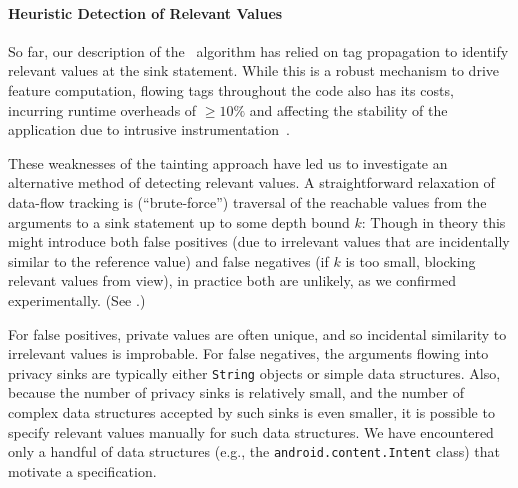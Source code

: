 \paragraph{Heuristic Detection of Relevant Values} So far, our description of the \Tool\ algorithm has relied on tag propagation to identify relevant values at the sink statement. While this is a robust mechanism to drive feature computation, flowing tags throughout the code also has its costs, incurring runtime overheads of $\geq 10\%$ and affecting the stability of the application due to intrusive instrumentation~\cite{EGCCJMS:OSDI10}.

These weaknesses of the tainting approach have led us to investigate an alternative method of detecting relevant values. A straightforward relaxation of data-flow tracking is  (``brute-force'') traversal of the reachable values from the arguments to a sink statement up to some depth bound $k$: 
Though in theory this might introduce both false positives (due to irrelevant values that are incidentally similar to the reference value) and false negatives (if $k$ is too small, blocking relevant values from view), in practice both are unlikely, as we confirmed experimentally. (See .) 

For false positives, private values are often unique, and so incidental similarity to irrelevant values is improbable. For false negatives, the arguments flowing into privacy sinks are typically either {\tt String} objects or simple data structures. Also, because the number of privacy sinks is relatively small, and the number of complex data structures accepted by such sinks is even smaller, it is possible to specify relevant values manually for such data structures. We have encountered only a handful of data structures (e.g., the \texttt{android.content.Intent} class) that motivate a specification. 



